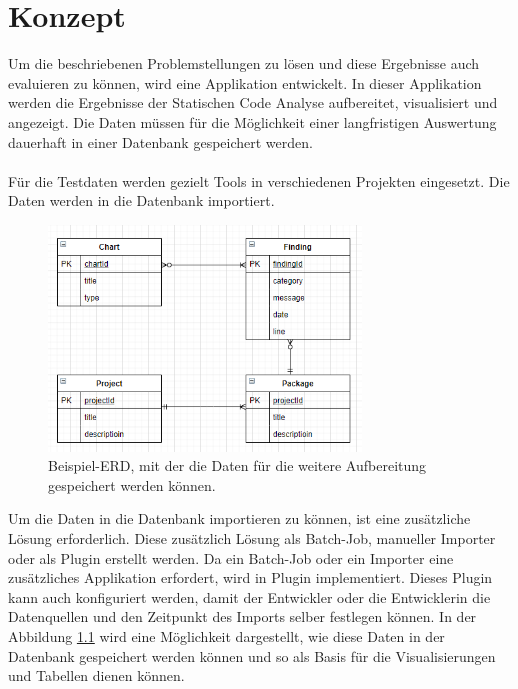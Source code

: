 \chapter{Konzept}
\label{chap:concept}
\chapterstart
Um die beschriebenen Problemstellungen zu lösen und diese Ergebnisse auch evaluieren zu können, wird eine Applikation entwickelt. In dieser Applikation werden die Ergebnisse der Statischen Code Analyse aufbereitet, visualisiert und angezeigt. Die Daten müssen für die Möglichkeit einer langfristigen Auswertung dauerhaft in einer Datenbank gespeichert werden. \\\\ Für die Testdaten werden gezielt Tools in verschiedenen Projekten eingesetzt. Die Daten werden in die Datenbank importiert. 
\begin{figure}[tp]
  \centering
  \includegraphics[height=6cm]{images/chartERD.PNG}
 \caption[Beispiel-ERD, mit der die Daten für die weitere Aufbereitung gespeichert werden können.]{Beispiel-ERD, mit der die Daten für die weitere Aufbereitung gespeichert werden können.}
  \label{fig:chartERD}
\end{figure}
Um die Daten in die Datenbank importieren zu können, ist eine zusätzliche Lösung erforderlich. Diese zusätzlich Lösung als Batch-Job, manueller Importer oder als Plugin erstellt werden. Da ein Batch-Job oder ein Importer eine zusätzliches Applikation erfordert, wird in Plugin implementiert. Dieses Plugin kann auch konfiguriert werden, damit der Entwickler oder die Entwicklerin die Datenquellen und den Zeitpunkt des Imports selber festlegen können. In der Abbildung \ref{fig:chartERD} wird eine Möglichkeit dargestellt, wie diese Daten in der Datenbank gespeichert werden können und so als Basis für die Visualisierungen und Tabellen dienen können. \\\\
